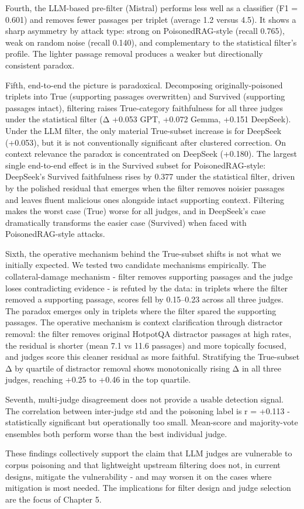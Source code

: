 Fourth, the LLM-based pre-filter (Mistral) performs less well as a classifier (F1 = 0.601) and removes fewer passages per triplet (average 1.2 versus 4.5). It shows a sharp asymmetry by attack type: strong on PoisonedRAG-style (recall 0.765), weak on random noise (recall 0.140), and complementary to the statistical filter's profile. The lighter passage removal produces a weaker but directionally consistent paradox.

Fifth, end-to-end the picture is paradoxical. Decomposing originally-poisoned triplets into True (supporting passages overwritten) and Survived (supporting passages intact), filtering raises True-category faithfulness for all three judges under the statistical filter (Δ +0.053 GPT, +0.072 Gemma, +0.151 DeepSeek). Under the LLM filter, the only material True-subset increase is for DeepSeek (+0.053), but it is not conventionally significant after clustered correction. On context relevance the paradox is concentrated on DeepSeek (+0.180). The largest single end-to-end effect is in the Survived subset for PoisonedRAG-style: DeepSeek's Survived faithfulness rises by 0.377 under the statistical filter, driven by the polished residual that emerges when the filter removes noisier passages and leaves fluent malicious ones alongside intact supporting context. Filtering makes the worst case (True) worse for all judges, and in DeepSeek's case dramatically transforms the easier case (Survived) when faced with PoisonedRAG-style attacks.

Sixth, the operative mechanism behind the True-subset shifts is not what we initially expected. We tested two candidate mechanisms empirically. The collateral-damage mechanism - filter removes supporting passages and the judge loses contradicting evidence - is refuted by the data: in triplets where the filter removed a supporting passage, scores fell by 0.15–0.23 across all three judges. The paradox emerges only in triplets where the filter spared the supporting passages. The operative mechanism is context clarification through distractor removal: the filter removes original HotpotQA distractor passages at high rates, the residual is shorter (mean 7.1 vs 11.6 passages) and more topically focused, and judges score this cleaner residual as more faithful. Stratifying the True-subset Δ by quartile of distractor removal shows monotonically rising Δ in all three judges, reaching +0.25 to +0.46 in the top quartile.

Seventh, multi-judge disagreement does not provide a usable detection signal. The correlation between inter-judge std and the poisoning label is r = +0.113 - statistically significant but operationally too small. Mean-score and majority-vote ensembles both perform worse than the best individual judge.

These findings collectively support the claim that LLM judges are vulnerable to corpus poisoning and that lightweight upstream filtering does not, in current designs, mitigate the vulnerability - and may worsen it on the cases where mitigation is most needed. The implications for filter design and judge selection are the focus of Chapter 5.
